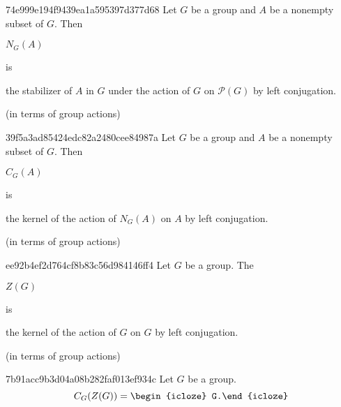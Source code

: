 \begin{note}{74e999e194f9439ea1a595397d377d68}
    Let \({ G }\) be a group and \({ A }\) be a nonempty subset of \({ G }\).
    Then \begin{icloze}{2}\({ N_G(A) }\)\end{icloze} is \begin{icloze}{1}the stabilizer of \({ A }\) in \({ G }\) under the action of \({ G }\) on \({ \mathcal P(G) }\) by left conjugation.\end{icloze}

    \begin{center}
        \tiny
        (in terms of group actions)
    \end{center}
\end{note}

\begin{note}{39f5a3ad85424edc82a2480cee84987a}
    Let \({ G }\) be a group and \({ A }\) be a nonempty subset of \({ G }\).
    Then \begin{icloze}{2}\({ C_G(A) }\)\end{icloze} is \begin{icloze}{1}the kernel of the action of \({ N_G(A) }\) on \({ A }\) by left conjugation.\end{icloze}

    \begin{center}
        \tiny
        (in terms of group actions)
    \end{center}
\end{note}

\begin{note}{ee92b4ef2d764cf8b83c56d984146ff4}
    Let \({ G }\) be a group.
    The \begin{icloze}{2}\({ Z(G) }\)\end{icloze} is \begin{icloze}{1}the kernel of the action of \({ G }\) on \({ G }\) by left conjugation.\end{icloze}

    \begin{center}
        \tiny
        (in terms of group actions)
    \end{center}
\end{note}

\begin{note}{7b91acc9b3d04a08b282faf013ef934c}
    Let \({ G }\) be a group.
    \[
        C_G (Z(G)) = \begin{icloze}{1}G.\end{icloze}
    \]
\end{note}

